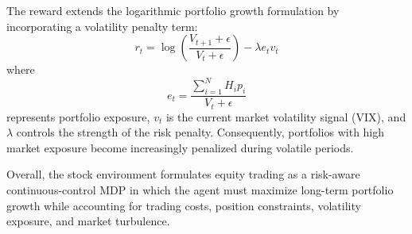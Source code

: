 The reward extends the logarithmic portfolio growth formulation by incorporating a volatility
penalty term:
\[
r_t
=
\log
\left(
\frac{V_{t+1}+\epsilon}
{V_t+\epsilon}
\right)
-
\lambda e_tv_t
\]
where
\[
e_t=
\frac{\sum_{i=1}^{N}H_ip_i}
{V_t+\epsilon}
\]
represents portfolio exposure, $v_t$ is the current market volatility signal (VIX), and
$\lambda$ controls the strength of the risk penalty. Consequently, portfolios with high
market exposure become increasingly penalized during volatile periods.

Overall, the stock environment formulates equity trading as a risk-aware continuous-control
MDP in which the agent must maximize long-term portfolio growth while accounting for trading
costs, position constraints, volatility exposure, and market turbulence.